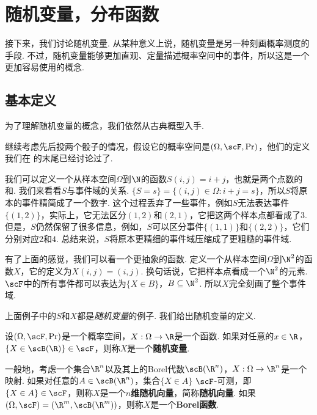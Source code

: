 \section{随机变量，分布函数}\label{sec:random-variable}

接下来，我们讨论随机变量. 从某种意义上说，随机变量是另一种刻画概率测度的手段. 不过，随机变量能够更加直观、定量描述概率空间中的事件，所以这是一个更加容易使用的概念. 

\subsection{基本定义}

为了理解随机变量的概念，我们依然从古典概型入手. 

\begin{example}\label{ex:random-variable}
继续考虑先后投两个骰子的情况，假设它的概率空间是$(\Omega,\scF,\Pr)$，他们的定义我们在 的末尾已经讨论过了. 

我们可以定义一个从样本空间$\Omega$到$\N$的函数$S(i,j)=i+j$，也就是两个点数的和. 我们来看看$S$与事件域的关系. $\{S=s\}=\{(i,j)\in\Omega:i+j=s\}$，所以$S$将原本的事件精简成了一个数字. 这个过程丢弃了一些事件，例如$S$无法表达事件$\{(1,2)\}$，实际上，它无法区分$(1,2)$和$(2,1)$，它把这两个样本点都看成了$3$. 但是，$S$仍然保留了很多信息，例如，$S$可以区分事件$\{(1,1)\}$和$\{(2,2)\}$，它们分别对应$2$和$4$. 总结来说，$S$将原本更精细的事件域压缩成了更粗糙的事件域. 

有了上面的感觉，我们可以看一个更抽象的函数. 定义一个从样本空间$\Omega$到$\N^2$的函数$X$，它的定义为$X(i,j) = (i,j)$. 换句话说，它把样本点看成一个$\N^2$的元素. $\scF$中的所有事件都可以表达为$\{X\in B\}$，$B\subseteq\N^2$. 所以$X$完全刻画了整个事件域. 
\end{example}

上面例子中的$S$和$X$都是\emph{随机变量}的例子. 我们给出随机变量的定义. 

\begin{definition}
设$(\Omega,\scF,\Pr)$是一个概率空间，$X:\Omega\to\R$是一个函数. 如果对任意的$x\in\R$，$\{X\in\scB(\R)\}\in\scF$，则称$X$是一个\textbf{随机变量}. 

一般地，考虑一个集合$\R^n$以及其上的Borel代数$\scB(\R^n)$，$X:\Omega\to \R^n$是一个映射. 如果对任意的$A\in\scB(\R^n)$，集合$\{X\in A\}$ $\scF$-可测，即$\{X\in A\}\in\scF$，则称$X$是一个\textbf{$n$维随机向量}，简称\textbf{随机向量}. 如果$(\Omega,\scF)=(\R^m,\scB(\R^m))$，则称$X$是一个\textbf{Borel函数}.
\end{definition}

